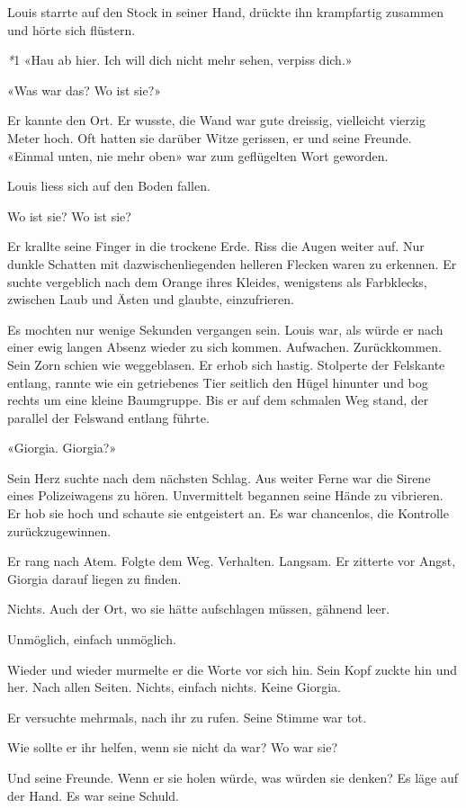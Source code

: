 Louis starrte auf den Stock in seiner Hand, drückte ihn krampfartig
zusammen und hörte sich flüstern.

\emph{*}1 «Hau ab hier. Ich will dich nicht mehr sehen, verpiss dich.»

«Was war das? Wo ist sie?»

Er kannte den Ort. Er wusste, die Wand war gute dreissig, vielleicht
vierzig Meter hoch. Oft hatten sie darüber Witze gerissen, er und seine
Freunde. «Einmal unten, nie mehr oben» war zum geflügelten Wort
geworden.

Louis liess sich auf den Boden fallen.

Wo ist sie? Wo ist sie?

Er krallte seine Finger in die trockene Erde. Riss die Augen weiter auf.
Nur dunkle Schatten mit dazwischenliegenden helleren Flecken waren zu
erkennen. Er suchte vergeblich nach dem Orange ihres Kleides, wenigstens
als Farbklecks, zwischen Laub und Ästen und glaubte, einzufrieren.

Es mochten nur wenige Sekunden vergangen sein. Louis war, als würde er
nach einer ewig langen Absenz wieder zu sich kommen. Aufwachen.
Zurückkommen. Sein Zorn schien wie weggeblasen. Er erhob sich hastig.
Stolperte der Felskante entlang, rannte wie ein getriebenes Tier
seitlich den Hügel hinunter und bog rechts um eine kleine Baumgruppe.
Bis er auf dem schmalen Weg stand, der parallel der Felswand entlang
führte.

«Giorgia. Giorgia?»

Sein Herz suchte nach dem nächsten Schlag. Aus weiter Ferne war die
Sirene eines Polizeiwagens zu hören. Unvermittelt begannen seine Hände
zu vibrieren. Er hob sie hoch und schaute sie entgeistert an. Es war
chancenlos, die Kontrolle zurückzugewinnen.

Er rang nach Atem. Folgte dem Weg. Verhalten. Langsam. Er zitterte vor
Angst, Giorgia darauf liegen zu finden.

Nichts. Auch der Ort, wo sie hätte aufschlagen müssen, gähnend leer.

Unmöglich, einfach unmöglich.

Wieder und wieder murmelte er die Worte vor sich hin. Sein Kopf zuckte
hin und her. Nach allen Seiten. Nichts, einfach nichts. Keine Giorgia.

Er versuchte mehrmals, nach ihr zu rufen. Seine Stimme war tot.

Wie sollte er ihr helfen, wenn sie nicht da war? Wo war sie?

Und seine Freunde. Wenn er sie holen würde, was würden sie denken? Es
läge auf der Hand. Es war seine Schuld.

